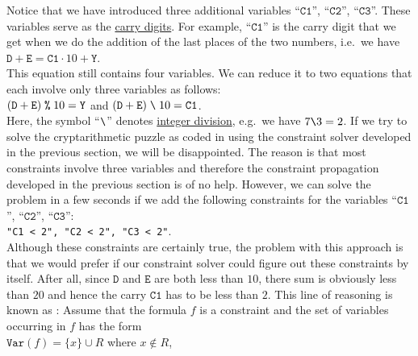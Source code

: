 Notice that we have introduced three additional variables ``$\texttt{C1}$'', ``$\texttt{C2}$'', ``$\texttt{C3}$''. 
These variables serve as the \href{https://en.wikipedia.org/wiki/Carry_(arithmetic)}{carry digits}.  For
example, ``$\texttt{C1}$'' is the carry digit that we get when we do the addition of the last places of the two
numbers, i.e.~we have
\\[0.2cm]
\hspace*{1.3cm}
$\texttt{D} + \texttt{E} = \texttt{C1} \cdot 10 + \texttt{Y}$.
\\[0.2cm]
This equation still contains four variables.  We can reduce it to two equations that each involve only three
variables as follows:
\\[0.2cm]
\hspace*{1.3cm}
$(\texttt{D} + \texttt{E})\; \texttt{\symbol{37}}\; 10 = \texttt{Y}$ \quad and \quad
$(\texttt{D} + \texttt{E}) \;\texttt{\symbol{92}}\; 10 = \texttt{C1}$.
\\[0.2cm]
Here, the symbol ``$\texttt{\symbol{92}}$'' denotes 
\href{https://en.wikipedia.org/wiki/Division_(mathematics)#Of_integers}{integer division}, e.g.~we have $7 \texttt{\symbol{92}} 3 = 2$.
If we try to solve the cryptarithmetic puzzle as coded in  using the
constraint solver developed in the previous section, we will be disappointed.  The reason is that most
constraints involve three variables and therefore the constraint propagation developed in the previous section
is of no help.  However, we can solve the problem in a few seconds if we add the following constraints for the
variables ``$\texttt{C1}$'', ``$\texttt{C2}$'', ``$\texttt{C3}$'':
\\[0.2cm]
\hspace*{1.3cm}
\texttt{"C1 < 2", "C2 < 2", "C3 < 2"}.
\\[0.2cm]
Although these constraints are certainly true, the problem with this approach is that we would prefer if our
constraint solver could figure out these constraints by itself.  After all, since $\texttt{D}$ and
$\texttt{E}$ are both less than $10$, there sum is obviously less than $20$ and hence the carry $\texttt{C1}$
has to be less than $2$.  This line of reasoning is known as :
Assume that the formula $f$ is a constraint and the set of variables occurring in $f$ has the form
\\[0.2cm]
\hspace*{1.3cm}
$\texttt{Var}(f) = \{ x \} \cup R$ \quad where $x \not\in R$,
\\[0.2cm]
